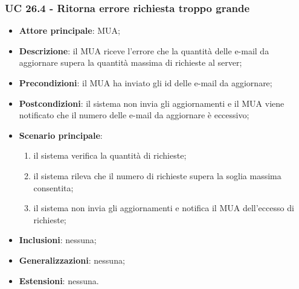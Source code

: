     \subsubsection{UC 26.4 - Ritorna errore richiesta troppo grande} \label{sec:UC26.4}
    \begin{itemize}
        \item \textbf{Attore principale}: MUA;
        \item \textbf{Descrizione}: il MUA riceve l'errore che la quantità delle e-mail da aggiornare supera la quantità massima di richieste al server;
        \item \textbf{Precondizioni}: il MUA ha inviato gli id delle e-mail da aggiornare;
        \item \textbf{Postcondizioni}: il sistema non invia gli aggiornamenti e il MUA viene notificato che il numero delle e-mail da aggiornare è eccessivo;
        \item \textbf{Scenario principale}:
            \begin{enumerate}
                \item il sistema verifica la quantità di richieste;
                \item il sistema rileva che il numero di richieste supera la soglia massima consentita;
                \item il sistema non invia gli aggiornamenti e notifica il MUA dell'eccesso di richieste;
            \end{enumerate}
        \item \textbf{Inclusioni}: nessuna;
        \item \textbf{Generalizzazioni}: nessuna;
        \item \textbf{Estensioni}: nessuna.
    \end{itemize}

